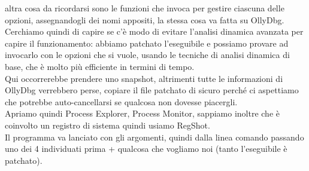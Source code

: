 \documentclass[12pt, oneside]{extbook}
\begin{document}
altra cosa da ricordarsi sono le funzioni che invoca per gestire ciascuna delle opzioni, assegnandogli dei nomi appositi, la stessa cosa va fatta su OllyDbg.\\Cerchiamo quindi di capire se c'è modo di evitare l'analisi dinamica avanzata per capire il funzionamento: abbiamo patchato l'eseguibile e possiamo provare ad invocarlo con le opzioni che si vuole, usando le tecniche di analisi dinamica di base, che è molto più efficiente in termini di tempo.\\ Qui occorrerebbe prendere uno snapshot, altrimenti tutte le informazioni di OllyDbg verrebbero perse, copiare il file patchato di sicuro perché ci aspettiamo che potrebbe auto-cancellarsi se qualcosa non dovesse piacergli.\\Apriamo quindi Process Explorer, Process Monitor, sappiamo inoltre che è coinvolto un registro di sistema quindi usiamo RegShot.\\Il programma va lanciato con gli argomenti, quindi dalla linea comando passando uno dei 4 individuati prima + qualcosa che vogliamo noi (tanto l'eseguibile è patchato).
\end{document}
